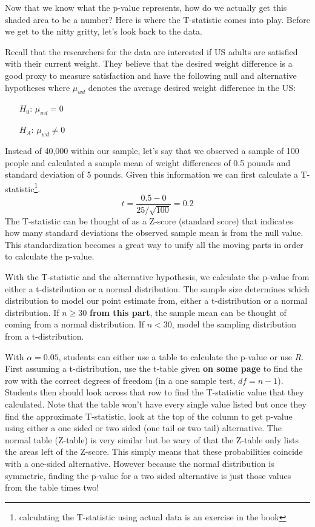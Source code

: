 Now that we know what the p-value represents, how do we actually get this shaded area to be a number? Here is where the T-statistic comes into play. Before we get to the nitty gritty, let's look back to the  data. 

Recall that the researchers for the  data are interested if US adults are satisfied with their current weight. They believe that the desired weight difference is a good proxy to measure satisfaction and have the following null and alternative hypotheses where $\mu_{wd}$ denotes the average desired weight difference in the US: 

 \begin{itemize}
\setlength{\itemsep}{0mm}
\item[$H_0$:] $\mu_{wd}=0$
\item[$H_A$:] $\mu_{wd} \neq 0$ 
\end{itemize}

Instead of 40,000 within our sample, let's say that we observed a sample of 100 people and calculated a sample mean of weight differences of 0.5 pounds and standard deviation of 5 pounds. Given this information we can first calculate a T-statistic\footnote{calculating the T-statistic using actual data is an exercise in the book}. \[t=\frac{0.5-0}{25/\sqrt{100}}= 0.2\] The T-statistic can be thought of as a Z-score (standard score) that indicates how many standard deviations the observed sample mean is from the null value. This standardization becomes a great way to unify all the moving parts in order to calculate the p-value. 

With the T-statistic and the alternative hypothesis, we calculate the p-value from either a t-distribution or a normal distribution. The sample size determines which distribution to model our point estimate from, either a t-distribution or a normal distribution. If $n \geq 30$ \textbf{from this part}, the sample mean can be thought of coming from a normal distribution. If $n < 30$, model the sampling distribution from a t-distribution. 

With $\alpha=0.05$, students can either use a table to calculate the p-value or use $R$. First assuming a t-distribution, use the t-table given \textbf{on some page} to find the row with the correct degrees of freedom (in a one sample test, $df=n-1$). Students then should look across that row to find the T-statistic value that they calculated. Note that the table won't have every single value listed but once they find the approximate T-statistic, look at the top of the column to get p-value using either a one sided or two sided (one tail or two tail) alternative. The normal table (Z-table) is very similar but be wary of that the Z-table only lists the areas left of the Z-score. This simply means that these probabilities coincide with a one-sided alternative. However because the normal distribution is symmetric, finding the p-value for a two sided alternative is just those values from the table times two! 


